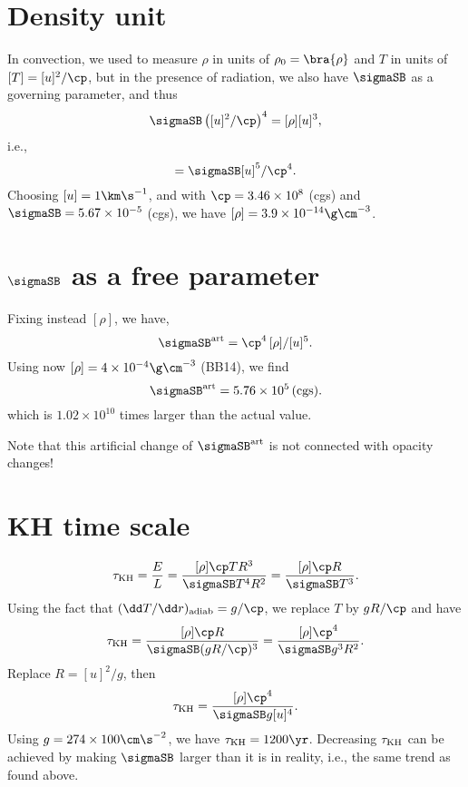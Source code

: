 \documentclass[twocolumn]{article}
\title{}
\author{}
\date{\today,~ $ $Revision: 1.101 $ $}
\begin{document}

\section{Density unit}

In convection, we used to measure $\rho$ in units of $\rho_0=\bra{\rho}$
and $T$ in units of $[T]=[u]^2/\cp$, but in the presence of radiation,
we also have $\sigmaSB$ as a governing parameter, and thus
\begin{equation}
\sigmaSB \left([u]^2/\cp\right)^4=[\rho][u]^3,
\end{equation}
i.e.,
\begin{equation}
[\rho]=\sigmaSB [u]^5/\cp^4.
\end{equation}
Choosing $[u]=1\km\s^{-1}$, and with
$\cp=3.46\times10^8$ (cgs) and
$\sigmaSB=5.67\times10^{-5}$ (cgs), we have
$[\rho]=3.9\times10^{-14}\g\cm^{-3}$.

\section{$\sigmaSB$ as a free parameter}

Fixing instead $[\rho]$, we have,
\begin{equation}
\sigmaSB^{\rm art}=\cp^4\,[\rho]/[u]^5.
\end{equation}
Using now $[\rho]=4\times10^{-4}\g\cm^{-3}$ (BB14), we find
\begin{equation}
\sigmaSB^{\rm art}=5.76\times10^5 \,\mbox{(cgs)}.
\end{equation}
which is $1.02\times10^{10}$ times larger than the actual value.

Note that this artificial change of $\sigmaSB^{\rm art}$ is
not connected with opacity changes!

\section{KH time scale}

\begin{equation}
\tau_{\rm KH}={E\over L}
={[\rho] \cp T R^3\over\sigmaSB T^4 R^2}
={[\rho] \cp R\over\sigmaSB T^3}.
\end{equation}
Using the fact that $(\dd T/\dd r)_{\rm adiab}=g/\cp$,
we replace $T$ by $gR/\cp$ and have
\begin{equation}
\tau_{\rm KH}
={[\rho] \cp R\over\sigmaSB (gR/\cp)^3}
={[\rho] \cp^4 \over\sigmaSB g^3 R^2}.
\end{equation}
Replace $R=[u]^2/g$, then
\begin{equation}
\tau_{\rm KH}
={[\rho] \cp^4 \over\sigmaSB g [u]^4}.
\end{equation}
Using $g=274\times100\cm\s^{-2}$, we have
$\tau_{\rm KH}=1200\yr$.
Decreasing $\tau_{\rm KH}$ can be achieved by making $\sigmaSB$
larger than it is in reality, i.e., the same trend as
found above.
\end{document}
